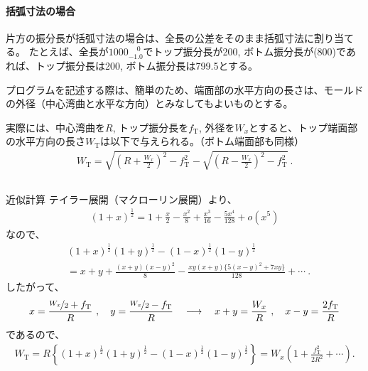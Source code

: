 \paragraph*{括弧寸法の場合}\noindent
片方の振分長が括弧寸法の場合は、全長の公差をそのまま括弧寸法に割り当てる。
たとえば、全長が$1000^{\phantom +0}_{-1.0}$でトップ振分長が200, ボトム振分長が(800)であれば、トップ振分長は200, ボトム振分長は799.5とする。




プログラムを記述する際は、簡単のため、端面部の水平方向の長さは、モールドの外径（中心湾曲と水平な方向）とみなしてもよいものとする。

実際には、中心湾曲を$R$, トップ振分長を$f_\mathrm T$, 外径を$W_x$とすると、トップ端面部の水平方向の長さ$W_\mathrm T$は以下で与えられる。（ボトム端面部も同様）
\begin{align*}
  W_\mathrm T
  = \sqrt{\left(R+\frac{W_x}2\right)^{\!2}-f_\mathrm T^2}
    -\sqrt{\left(R-\frac{W_x}2\right)^{\!2}-f_\mathrm T^2}\ .
\end{align*}
\begin{Column}{近似計算}
テイラー展開（マクローリン展開）より、
\begin{align*}
  (1+x)^\frac12 = 1+\frac x2-\frac{x^2}8+\frac{x^3}{16}-\frac{5x^4}{128}+o\!\left(x^5\right)
\end{align*}
なので、
\begin{align*}
  & (1+x)^\frac12(1+y)^\frac12-(1-x)^\frac12(1-y)^\frac12\\
  &= x+y+\frac{(x+y)(x-y)^2}8-\frac{xy(x+y)\big\{5(x-y)^2+7xy\big\}}{128}+\cdots\ .
\end{align*}
したがって、
\begin{align*}
  x = \frac{\nicefrac{W_x}2+f_\mathrm T}R\ ,\quad y = \frac{\nicefrac{W_x}2-f_\mathrm T}R\quad
  \longrightarrow \quad
  x+y = \frac{W_x}R\ , \quad x-y = \frac{2f_\mathrm T}R
\end{align*}
であるので、
\begin{align*}
  W_\mathrm T
  = R\left\{(1+x)^\frac12(1+y)^\frac12-(1-x)^\frac12(1-y)^\frac12\right\}
  = W_x\!\left(1+\frac{f_\mathrm T^2}{2R^2}+\cdots\right).
\end{align*}
\end{Column}


